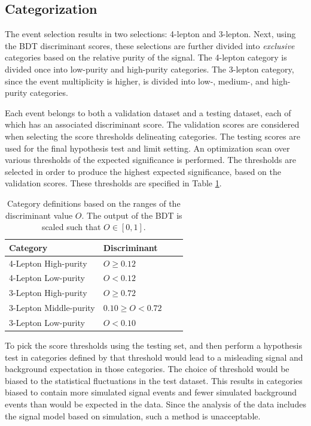\subsection{Categorization}

The event selection results in two selections: 4-lepton and 3-lepton.
Next, using the BDT discriminant scores, these selections are further divided into \emph{exclusive} categories based on the relative purity of the signal.
The 4-lepton category is divided once into low-purity and high-purity categories.
The 3-lepton category, since the event multiplicity is higher, is divided into low-, medium-, and high-purity categories.

Each event belongs to both a validation dataset and a testing dataset, each of which has an associated discriminant score.
The validation scores are considered when selecting the score thresholds delineating categories.
The testing scores are used for the final hypothesis test and limit setting.
An optimization scan over various thresholds of the expected significance is performed.
The thresholds are selected in order to produce the highest expected significance, based on the validation scores.
These thresholds are specified in Table \ref{tab:hmmBdtCuts}.

\begin{table}[htp]
\begin{center}
\begin{tabular}{l l l l}
\toprule
Category & Discriminant \\
\midrule
4-Lepton High-purity & $O\ge0.12$ \\
4-Lepton Low-purity & $O<0.12$ \\
3-Lepton High-purity & $O\ge0.72$ \\
3-Lepton Middle-purity & $0.10\ge O<0.72$ \\
3-Lepton Low-purity & $O<0.10$ \\
\bottomrule
\end{tabular}
\caption{Category definitions based on the ranges of the discriminant value $O$. The output of the BDT is scaled such that $O\in[0,1]$.}
\label{tab:hmmBdtCuts}
\end{center}
\end{table}

To pick the score thresholds using the testing set, and then perform a hypothesis test in categories defined by that threshold would lead to a misleading signal and background expectation in those categories.
The choice of threshold would be biased to the statistical fluctuations in the test dataset.
This results in categories biased to contain more simulated signal events and fewer simulated background events than would be expected in the data.
Since the analysis of the data includes the signal model based on simulation, such a method is unacceptable.

